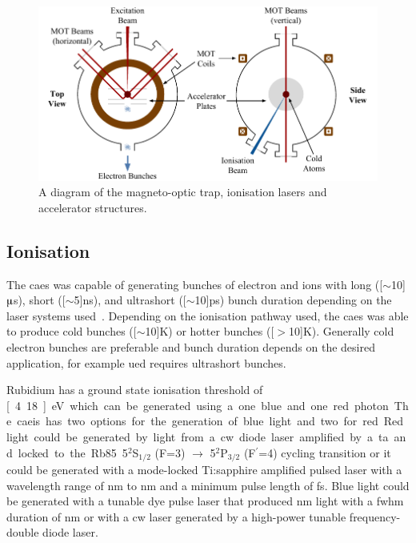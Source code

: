 \begin{figure}
    \center
    \includegraphics[width=145mm]{part2/Figs/MOTdiagram.pdf}
    \caption[A diagram of the magneto-optic trap.]{A diagram of the magneto-optic trap, ionisation lasers and accelerator structures.}
    \label{figure:mot}
\end{figure}

\subsection{Ionisation}\label{section:two_stage_ionisation}

The \gls{caes} was capable of generating bunches of electron and ions with long (\unit[$\sim$10]{$\muup$s}), short (\unit[$\sim$5]{ns}), and ultrashort (\unit[$\sim$10]{ps}) bunch duration depending on the laser systems used~\cite{speirs_identification_2017,speirs_electron_2017}.
Depending on the ionisation pathway used, the \gls{caes} was able to produce cold bunches (\unit[$\sim$10]{K}) or hotter bunches (\unit[$>$10]{K}).
Generally cold electron bunches are preferable and bunch duration depends on the desired application, for example \gls{ued} requires ultrashort bunches.

Rubidium has a ground state ionisation threshold of \unit[4.18]{eV} which can be generated using a one blue and one red photon.
The \gls{caeis} has two options for the generation of blue light and two for red.
Red light could be generated by light from a \gls{cw} diode laser amplified by a \gls{ta} and locked to the Rb85 5$^2$S$_{1/2}$ (F=3) $\rightarrow$ 5$^2$P$_{3/2}$ (F$^\prime$=4) cycling transition or it could be generated with a mode-locked Ti:sapphire amplified pulsed laser with a wavelength range of \unit[770]{nm} to \unit[830]{nm} and a minimum pulse length of \unit[35]{fs}.
Blue light could be generated with a tunable dye pulse laser that produced \unit[460 to 490]{nm} light with a \gls{fwhm} duration of \unit[5]{nm} or with a \gls{cw} laser generated by a high-power tunable frequency-double diode laser.

